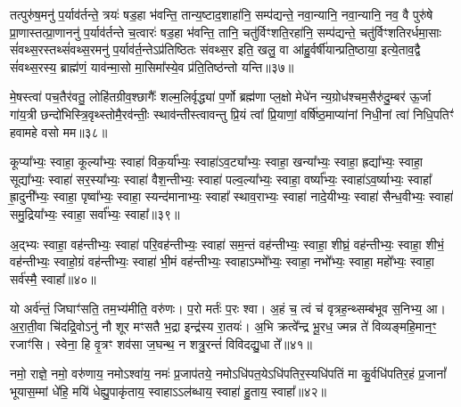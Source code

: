 तत्पुरु॑ष॒मनु॑ प॒र्याव॑र्तन्ते॒ त्रयः॑ षड॒हा भ॑वन्ति॒ तान्य॒ष्टाद॒शाहा॑नि॒ सम्प॑द्यन्ते॒ नवा॒न्यानि॒ नवा॒न्यानि॒ नव॒ वै पुरु॑षे प्रा॒णास्तत्प्रा॒णाननु॑ प॒र्याव॑र्तन्ते च॒त्वारः॑ षड॒हा भ॑वन्ति॒ तानि॒ चतु॑र्विꣳशति॒रहा॑नि॒ सम्प॑द्यन्ते॒ चतु॑र्विꣳशतिरर्धमा॒साः सं॑वथ्स॒रस्तथ्सं॑वथ्स॒रमनु॑ प॒र्याव॑र्त॒न्ते\-ऽप्र॑तिष्ठितः संवथ्स॒र इति॒ खलु॒ वा आ॑हु॒र्वर्\mbox{}षी॑यान्प्रति॒ष्ठाया॒ इत्ये॒ताव॒द्वै सं॑वथ्स॒रस्य॒ ब्राह्म॑णं॒ याव॑न्मा॒सो मा॒सिमा᳚स्ये॒व प्र॑ति॒तिष्ठ॑न्तो यन्ति॥३७॥

{\anuvakamend[{वि॒राज॑मे॒तेन॑ द्वाद॒शावे॒ताव॒द्वा अ॒ष्टौ च॑॥11॥}]}

मे॒षस्त्वा॑ पच॒तैर॑वतु॒ लोहि॑तग्रीव॒श्छागैः᳚ शल्म॒लिर्वृद्ध्या॑ प॒र्णो ब्रह्म॑णा प्ल॒क्षो मेधे॑न न्य॒ग्रोध॑श्चम॒सैरु॑दु॒म्बर॑ ऊ॒र्जा गा॑य॒त्री छन्दो॑भिस्त्रि॒वृथ्स्तोमै॒रव॑न्तीः॒ स्थाव॑न्तीस्त्वावन्तु प्रि॒यं त्वा᳚ प्रि॒याणां॒ वर्\mbox{}षि॑ष्ठ॒माप्या॑नां निधी॒नां त्वा॑ निधि॒पतिꣳ॑ हवामहे वसो मम॥३८॥

{\anuvakamend[{मे॒षष्षट्त्रिꣳ॑शत्॥12॥}]}

कूप्या᳚भ्यः॒ स्वाहा॒ कूल्या᳚भ्यः॒ स्वाहा॑ विक॒र्या᳚भ्यः॒ स्वाहा॑\-ऽव॒ट्या᳚भ्यः॒ स्वाहा॒ खन्या᳚भ्यः॒ स्वाहा॒ ह्रद्या᳚भ्यः॒ स्वाहा॒ सूद्या᳚भ्यः॒ स्वाहा॑ सर॒स्या᳚भ्यः॒ स्वाहा॑ वैश॒न्तीभ्यः॒ स्वाहा॑ पल्व॒ल्या᳚भ्यः॒ स्वाहा॒ वर्ष्या᳚भ्यः॒ स्वाहा॑\-ऽव॒र्ष्याभ्यः॒ स्वाहा᳚ ह्रा॒दुनी᳚भ्यः॒ स्वाहा॒ पृष्वा᳚भ्यः॒ स्वाहा॒ स्यन्द॑मानाभ्यः॒ स्वाहा᳚ स्थाव॒राभ्यः॒ स्वाहा॑ नादे॒यीभ्यः॒ स्वाहा॑ सैन्ध॒वीभ्यः॒ स्वाहा॑ समु॒द्रिया᳚भ्यः॒ स्वाहा॒ सर्वा᳚भ्यः॒ स्वाहा᳚॥३९॥

{\anuvakamend[{कूप्या᳚भ्यश्चत्वारि॒ꣳ॒शत्॥13॥}]}

अ॒द्भ्यः स्वाहा॒ वह॑न्तीभ्यः॒ स्वाहा॑ परि॒वह॑न्तीभ्यः॒ स्वाहा॑ सम॒न्तं वह॑न्तीभ्यः॒ स्वाहा॒ शीघ्रं॒ वह॑न्तीभ्यः॒ स्वाहा॒ शीभं॒ वह॑न्तीभ्यः॒ स्वाहो॒ग्रं वह॑न्तीभ्यः॒ स्वाहा॑ भी॒मं वह॑न्तीभ्यः॒ स्वाहा\-ऽम्भो᳚भ्यः॒ स्वाहा॒ नभो᳚भ्यः॒ स्वाहा॒ महो᳚भ्यः॒ स्वाहा॒ सर्व॑स्मै॒ स्वाहा᳚॥४०॥

{\anuvakamend[{अ॒द्भ्य एका॒न्नत्रि॒ꣳ॒शत्॥14॥}]}

यो अर्व॑न्तं॒ जिघाꣳ॑सति॒ तम॒भ्य॑मीति॒ वरु॑णः। प॒रो मर्तः॑ प॒रः श्वा। अ॒हं च॒ त्वं च॑ वृत्रह॒न्थ्सम्ब॑भूव स॒निभ्य॒ आ। अ॒रा॒ती॒वा चि॑दद्रि॒वो\-ऽनु॑ नौ शूर मꣳसतै भ॒द्रा इन्द्र॑स्य रा॒तयः॑। अ॒भि क्रत्वे᳚न्द्र भू॒रध॒ ज्मन्न ते॑ विव्यङ्महि॒मान॒ꣳ॒ रजाꣳ॑सि। स्वेना॒ हि वृ॒त्रꣳ शव॑सा ज॒घन्थ॒ न शत्रु॒रन्तं॑ विविदद्यु॒धा ते᳚॥४१॥

{\anuvakamend[{वि॒वि॒दद्द्वे च॑॥15॥}]}

नमो॒ राज्ञे॒ नमो॒ वरु॑णाय॒ नमो\-ऽश्वा॑य॒ नमः॑ प्र॒जाप॑तये॒ नमो\-ऽधि॑पत॒ये\-ऽधि॑पतिर॒स्यधि॑पतिं मा कु॒र्वधि॑पतिर॒हं प्र॒जानां᳚ भूयास॒म्मां धे॑हि॒ मयि॑ धेह्यु॒पाकृ॑ताय॒ स्वाहा\-ऽ\-ऽल॑ब्धाय॒ स्वाहा॑ हु॒ताय॒ स्वाहा᳚॥४२॥

